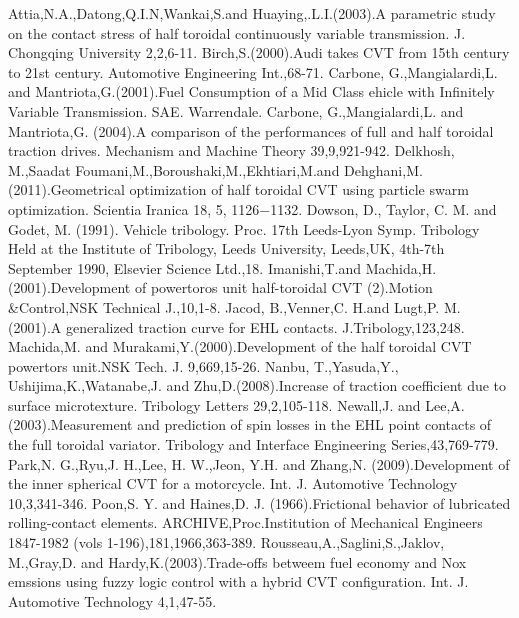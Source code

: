 \documentclass[a4paper,12pt]{article}
\begin{document}
\begin{multicols}{2}
\begin{thebibliography}{4}
Attia,N.A.,Datong,Q.I.N,Wankai,S.and Huaying,.L.I.(2003).A parametric study on the contact stress of half toroidal continuously variable transmission. J. Chongqing University 2,2,6-11.
Birch,S.(2000).Audi takes CVT from 15th century to 21st century. Automotive Engineering Int.,68-71.
Carbone, G.,Mangialardi,L. and Mantriota,G.(2001).Fuel Consumption of a Mid Class ehicle with Infinitely Variable Transmission. SAE. Warrendale.
Carbone, G.,Mangialardi,L. and Mantriota,G. (2004).A comparison of the performances of full and half toroidal traction drives. Mechanism and Machine Theory 39,9,921-942.
Delkhosh, M.,Saadat Foumani,M.,Boroushaki,M.,Ekhtiari,M.and Dehghani,M.(2011).Geometrical optimization of half toroidal CVT using particle swarm optimization. Scientia Iranica 18, 5, 1126−1132.
Dowson, D., Taylor, C. M. and Godet, M. (1991). Vehicle tribology. Proc. 17th Leeds-Lyon Symp. Tribology Held at the Institute of Tribology, Leeds University, Leeds,UK, 4th-7th September 1990, Elsevier Science Ltd.,18.
Imanishi,T.and Machida,H.(2001).Development of powertoros unit half-toroidal CVT (2).Motion \&Control,NSK Technical J.,10,1-8.
Jacod, B.,Venner,C. H.and Lugt,P. M.(2001).A generalized traction curve for EHL contacts. J.Tribology,123,248.
Machida,M. and Murakami,Y.(2000).Development of the half toroidal CVT powertors unit.NSK Tech. J. 9,669,15-26.
Nanbu, T.,Yasuda,Y., Ushijima,K.,Watanabe,J. and Zhu,D.(2008).Increase of traction coefficient due to surface microtexture. Tribology Letters 29,2,105-118.
Newall,J. and Lee,A. (2003).Measurement and prediction of spin losses in the EHL point contacts of the full toroidal variator. Tribology and Interface Engineering Series,43,769-779.
Park,N. G.,Ryu,J. H.,Lee, H. W.,Jeon, Y.H. and Zhang,N. (2009).Development of the inner spherical CVT for a motorcycle. Int. J. Automotive Technology 10,3,341-346.
Poon,S. Y. and Haines,D. J. (1966).Frictional behavior of lubricated rolling-contact elements. ARCHIVE,Proc.Institution of Mechanical Engineers 1847-1982 (vols 1-196),181,1966,363-389.
Rousseau,A.,Saglini,S.,Jaklov, M.,Gray,D. and Hardy,K.(2003).Trade-offs betweem fuel economy and Nox emssions using fuzzy logic control with a hybrid CVT configuration. Int. J. Automotive Technology 4,1,47-55.
\end{thebibliography}



\end{multicols}
\end{document}
